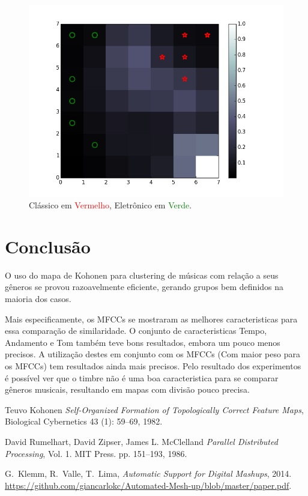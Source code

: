 \documentclass[journal]{IEEEtran}
\begin{document}
\begin{figure}[H]
\centering
\includegraphics[scale=0.5]{images/mfccs_classical_eletronic.png}
\caption{Clássico em \textcolor{red}{Vermelho}, Eletrônico em \textcolor{green}{Verde}.}\label{mfccs_classical_eletronic}
\end{figure}

\section{Conclusão}
O uso do mapa de Kohonen para clustering de músicas com relação a seus gêneros se provou razoavelmente eficiente, gerando grupos bem definidos na maioria dos casos.

Mais especificamente, os MFCCs se mostraram as melhores caracteristicas para essa comparação de similaridade. O conjunto de caracteristicas Tempo, Andamento e Tom também teve bons resultados, embora um pouco menos precisos. A utilização destes em conjunto com os MFCCs (Com maior peso para os MFCCs) tem resultados ainda mais precisos. Pelo resultado dos experimentos é possível ver que o timbre não é uma boa caracteristica para se comparar gêneros musicais, resultando em mapas com divisão pouco precisa.


\ifCLASSOPTIONcaptionsoff
  \newpage
\fi

\begin{thebibliography}{1}

Teuvo Kohonen \emph{Self-Organized Formation of Topologically Correct Feature Maps}, Biological Cybernetics 43 (1): 59–69, 1982.

David Rumelhart, David Zipser, James L. McClelland \emph{Parallel Distributed Processing}, Vol. 1. MIT Press. pp. 151–193, 1986.
  
G.~Klemm, R.~Valle, T.~Lima, \emph{Automatic Support for Digital Mashups}, 2014. \href{https://github.com/giancarlokc/Automated-Mesh-up/blob/master/paper.pdf}{https://github.com/giancarlokc/Automated-Mesh-up/blob/master/paper.pdf}. 

\end{thebibliography}
\end{document}
